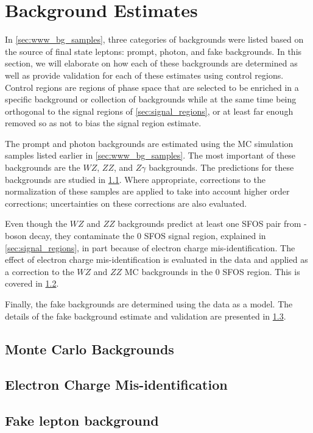 \section{Background Estimates}
\label{sec:bg_estimates}

In \sec\ref{sec:www_bg_samples}, three categories of backgrounds
were listed based on the source
of final state leptons: prompt, photon, and fake
backgrounds. In this section, we will elaborate on how
each of these backgrounds are determined as well
as provide validation for each of these estimates using
control regions. Control regions are regions of phase space
that are selected to be enriched in a specific background
or collection of backgrounds while at the same time being
orthogonal to the signal regions of \sec\ref{sec:signal_regions},
or at least far enough removed so as not to bias the signal region
estimate.

The prompt and photon backgrounds are estimated using 
the MC simulation samples listed earlier in \sec\ref{sec:www_bg_samples}.
The most important of these backgrounds are the $WZ$, $ZZ$, 
and $Z\gamma$ backgrounds. The predictions for these backgrounds
are studied in \sec\ref{sec:mcbg}. Where appropriate, corrections
to the normalization
of these samples are applied to take into account higher order 
corrections; uncertainties on these corrections are also evaluated.

Even though the $WZ$ and $ZZ$ backgrounds predict
at least one SFOS pair from \z-boson decay,
they contaminate the 0 SFOS signal region,
explained in \sec\ref{sec:signal_regions}, in part because
of electron charge mis-identification.  The effect of 
electron charge mis-identification is evaluated in the data
and applied as a correction to the $WZ$ and $ZZ$ MC backgrounds
in the 0 SFOS region. This is covered in \sec\ref{sec:charge_misid}.

Finally, the fake backgrounds are determined 
using the data as a model. The details of the fake background
estimate and validation are presented in \sec\ref{sec:bg_fake}.





\subsection{Monte Carlo Backgrounds}
\label{sec:mcbg}

\subsection{Electron Charge Mis-identification}
\label{sec:charge_misid}
  
\subsection{Fake lepton background}
\label{sec:bg_fake}

